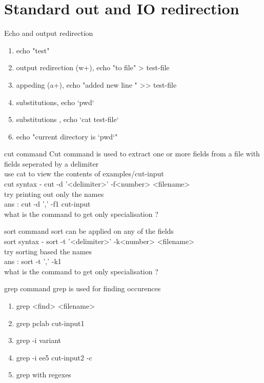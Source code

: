 \documentclass{beamer}
\begin{document}
\section{Standard out and IO redirection}
{
	\selectfont
\begin{frame}{Echo and output redirection}
	\begin{enumerate}
		\item<1-> echo "test"
		\item<2-> output redirection (w+), echo "to file" > test-file
		\item<3-> appeding (a+), echo "added new line " >> test-file
		\item<4-> substitutions, echo `pwd`
			\item<5-> substitutions , echo `cat test-file`
		\item<5-> echo "current directory is `pwd`"
	\end{enumerate}
\end{frame}
\begin{frame}{cut command}
	Cut command is used to extract one or more fields from a file with fields seperated by a delimiter\\
	use cat  to view the contents of examples/cut-input\\ \pause
	cut syntax - cut -d '<delimiter>' -f<number> <filename>\\
	try printing out only the names\\ \pause
	ans : cut -d ',' -f1 cut-input\\
	what is the command to get only specialisation ? \pause


\end{frame}
\begin{frame}{sort command}
	sort can be applied on any of the fields\\ \pause 
	sort syntax - sort -t '<delimiter>' -k<number> <filename>\\
	try sorting based the names\\ \pause
	ans : sort -t ',' -k1\\
	what is the command to get only specialisation ? \pause


\end{frame}
\begin{frame}{grep command}
	grep is used for finding occurences\\ 
	\begin{enumerate}
		\item<2-> grep <find> <filename>
		\item<2-> grep pclab cut-input1
		\item<3-> grep -i variant 
		\item<4-> grep -i ee5 cut-input2 -c 
		\item<6-> grep with regexes 
	\end{enumerate}



\end{frame}}
\end{document}
